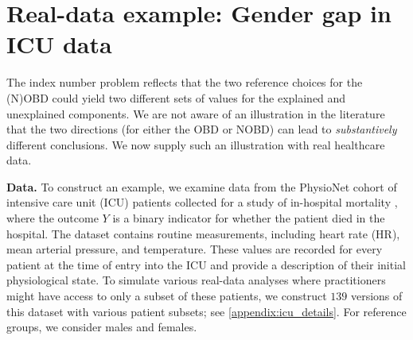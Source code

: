 \section{Real-data example: Gender gap in ICU data}
\label{sec:real_example}
The index number problem reflects that the two reference choices for the (N)OBD could yield two different sets of values for the explained and unexplained components. We are not aware of an illustration in the literature that the two directions (for either the OBD or NOBD) can lead to \emph{substantively} different conclusions. 
We now supply such an illustration with real healthcare data.

\textbf{Data.} To construct an example, we examine data from the PhysioNet cohort of intensive care unit (ICU) patients collected for a study of in-hospital mortality \citep{goldberger2000physiobank}, where the outcome $Y$ is a binary indicator for whether the patient died in the hospital. The dataset contains routine measurements, including heart rate (HR), mean arterial pressure, and temperature. These values are recorded for every patient at the time of entry into the ICU and provide a description of their initial physiological state. To simulate various real-data analyses where practitioners might have access to only a subset of these patients, we construct $139$ versions of this dataset with various patient subsets; see \cref{appendix:icu_details}.
For reference groups, we consider males and females.


